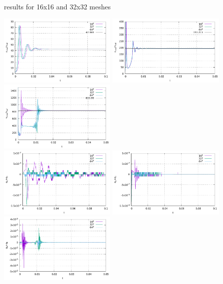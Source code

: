 \newpage
\aspect results for 16x16 and 32x32 meshes

\begin{center}
\includegraphics[width=5.7cm]{python_codes/fieldstone_110/results_BA/aspect/vrms_1e4}
\includegraphics[width=5.7cm]{python_codes/fieldstone_110/results_BA/aspect/vrms_1e5}
\includegraphics[width=5.7cm]{python_codes/fieldstone_110/results_BA/aspect/vrms_1e6}\\
\includegraphics[width=5.7cm]{python_codes/fieldstone_110/results_BA/aspect/qsum_1e4}
\includegraphics[width=5.7cm]{python_codes/fieldstone_110/results_BA/aspect/qsum_1e5}
\includegraphics[width=5.7cm]{python_codes/fieldstone_110/results_BA/aspect/qsum_1e6}\\

\end{center}
